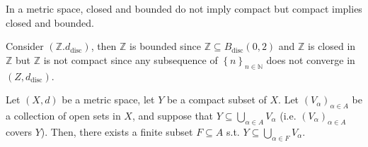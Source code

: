 \begin{remark}
    In a metric space, closed and bounded do not imply compact but compact implies closed and bounded.
\end{remark}

\begin{eg}
    Consider \(\left( \mathbb{Z} . d_{\text{disc}} \right) \), then \(\mathbb{Z} \) is bounded since \(\mathbb{Z} \subseteq B_{\text{disc}}(0, 2)\) and \(\mathbb{Z} \) is closed in \(\mathbb{Z} \)  but \(\mathbb{Z} \) is not compact since any subsequence of \(\left\{ n \right\}_{n \in \mathbb{N} } \) does not converge in \(\left( Z, d_{\text{disc}} \right) \). 
\end{eg}

\begin{theorem} \label{thm: compact to subcover}
    Let \((X, d)\) be a metric space, let \(Y\) be a compact subset of \(X\). Let \(\left( V_\alpha  \right)_{\alpha \in A} \) be a collection of open sets in \(X\), and suppose that \(Y \subseteq \bigcup_{\alpha \in A} V_\alpha  \) (i.e. \(\left( V_\alpha  \right)_{\alpha \in A} \) covers \(Y\)). Then, there exists a finite subset \(F \subseteq A\) s.t. \(Y \subseteq \bigcup_{\alpha \in F} V_\alpha  \).        
\end{theorem}
